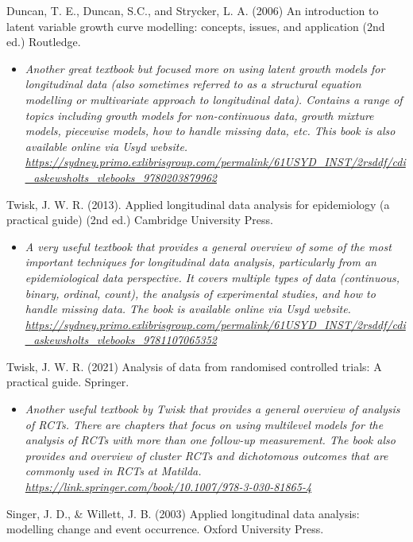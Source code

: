 \documentclass[
]{book}
\providecommand{\tightlist}{%
  \setlength{\itemsep}{0pt}\setlength{\parskip}{0pt}}
\begin{document}
Duncan, T. E., Duncan, S.C., and Strycker, L. A. (2006) An introduction to latent variable growth curve modelling: concepts, issues, and application (2nd ed.) Routledge.

\begin{itemize}
\tightlist
\item
  \emph{Another great textbook but focused more on using latent growth models for longitudinal data (also sometimes referred to as a structural equation modelling or multivariate approach to longitudinal data). Contains a range of topics including growth models for non-continuous data, growth mixture models, piecewise models, how to handle missing data, etc. This book is also available online via Usyd website. \url{https://sydney.primo.exlibrisgroup.com/permalink/61USYD_INST/2rsddf/cdi_askewsholts_vlebooks_9780203879962} }
\end{itemize}

Twisk, J. W. R. (2013). Applied longitudinal data analysis for epidemiology (a practical guide) (2nd ed.) Cambridge University Press.

\begin{itemize}
\tightlist
\item
  \emph{A very useful textbook that provides a general overview of some of the most important techniques for longitudinal data analysis, particularly from an epidemiological data perspective. It covers multiple types of data (continuous, binary, ordinal, count), the analysis of experimental studies, and how to handle missing data. The book is available online via Usyd website. \url{https://sydney.primo.exlibrisgroup.com/permalink/61USYD_INST/2rsddf/cdi_askewsholts_vlebooks_9781107065352} }
\end{itemize}

Twisk, J. W. R. (2021) Analysis of data from randomised controlled trials: A practical guide. Springer.

\begin{itemize}
\tightlist
\item
  \emph{Another useful textbook by Twisk that provides a general overview of analysis of RCTs. There are chapters that focus on using multilevel models for the analysis of RCTs with more than one follow-up measurement. The book also provides and overview of cluster RCTs and dichotomous outcomes that are commonly used in RCTs at Matilda. \url{https://link.springer.com/book/10.1007/978-3-030-81865-4} }
\end{itemize}

Singer, J. D., \& Willett, J. B. (2003) Applied longitudinal data analysis: modelling change and event occurrence. Oxford University Press.
\end{document}
